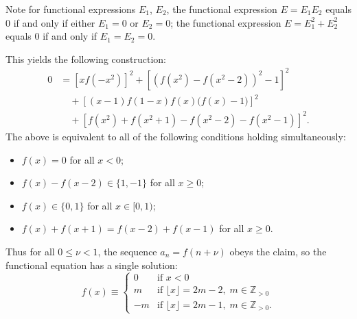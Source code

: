 Note for functional expressions $E_1$, $E_2$, the functional expression $E=E_1E_2$ equals $0$ if and only if either $E_1=0$ or $E_2=0$; the functional expression $E=E_1^2+E_2^2$ equals $0$ if and only if $E_1=E_2=0$.

This yields the following construction:
\begin{align*}
    0&=\left[xf\left(-x^2\right)\right]^2+\left[\left(f\left(x^2\right)-f\left(x^2-2\right)\right)^2-1\right]^2\\
    &\quad+\left[(x-1)f(1-x)f(x)\big(f(x)-1\big)\right]^2\\
    &\quad+\left[f\left(x^2\right)+f\left(x^2+1\right)-f\left(x^2-2\right)-f\left(x^2-1\right)\right]^2.
\end{align*}
The above is equivalent to all of the following conditions holding simultaneously:
\begin{itemize}[itemsep=0em]
    \item $f(x)=0$ for all $x<0$;
    \item $f(x)-f(x-2)\in\{1,-1\}$ for all $x\ge0$;
    \item $f(x)\in\{0,1\}$ for all $x\in[0,1)$;
    \item $f(x)+f(x+1)=f(x-2)+f(x-1)$ for all $x\ge0$.
\end{itemize}
Thus for all $0\le\nu<1$, the sequence $a_n=f(n+\nu)$ obeys the claim, so the functional equation has a single solution: \[f(x)\equiv\begin{cases}
        0&\text{if }x<0\\
        m&\text{if }\lfloor x\rfloor=2m-2,\;m\in\mathbb Z_{>0}\\
        -m&\text{if }\lfloor x\rfloor=2m-1,\;m\in\mathbb Z_{>0}.
\end{cases}\]
